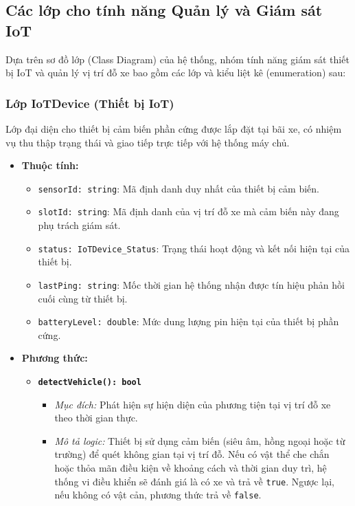 \subsection{Các lớp cho tính năng Quản lý và Giám sát IoT}

Dựa trên sơ đồ lớp (Class Diagram) của hệ thống, nhóm tính năng giám sát thiết bị IoT và quản lý vị trí đỗ xe bao gồm các lớp và kiểu liệt kê (enumeration) sau:

\subsubsection{Lớp IoTDevice (Thiết bị IoT)}
Lớp đại diện cho thiết bị cảm biến phần cứng được lắp đặt tại bãi xe, có nhiệm vụ thu thập trạng thái và giao tiếp trực tiếp với hệ thống máy chủ.

\begin{itemize}
    \item \textbf{Thuộc tính:}
    \begin{itemize}
        \item \texttt{sensorId: string}: Mã định danh duy nhất của thiết bị cảm biến.
        \item \texttt{slotId: string}: Mã định danh của vị trí đỗ xe mà cảm biến này đang phụ trách giám sát.
        \item \texttt{status: IoTDevice\_Status}: Trạng thái hoạt động và kết nối hiện tại của thiết bị.
        \item \texttt{lastPing: string}: Mốc thời gian hệ thống nhận được tín hiệu phản hồi cuối cùng từ thiết bị.
        \item \texttt{batteryLevel: double}: Mức dung lượng pin hiện tại của thiết bị phần cứng.
    \end{itemize}
    
    \item \textbf{Phương thức:}
    \begin{itemize}
        \item \textbf{\texttt{detectVehicle(): bool}}
        \begin{itemize}
            \item \textit{Mục đích:} Phát hiện sự hiện diện của phương tiện tại vị trí đỗ xe theo thời gian thực.
            \item \textit{Mô tả logic:} Thiết bị sử dụng cảm biến (siêu âm, hồng ngoại hoặc từ trường) để quét không gian tại vị trí đỗ. Nếu có vật thể che chắn hoặc thỏa mãn điều kiện về khoảng cách và thời gian duy trì, hệ thống vi điều khiển sẽ đánh giá là có xe và trả về \texttt{true}. Ngược lại, nếu không có vật cản, phương thức trả về \texttt{false}.
        \end{itemize}


\end{itemize}
\end{itemize}

